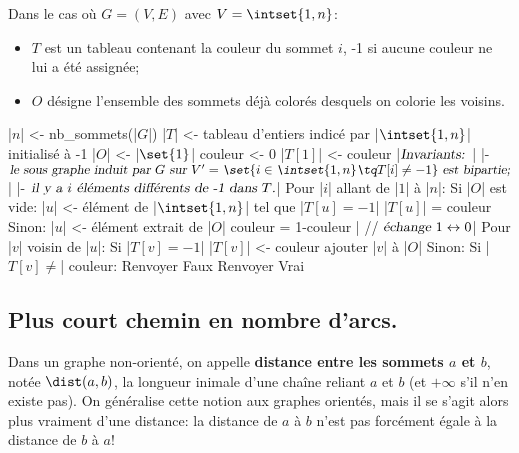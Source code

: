 \documentclass{scrartcl}
\begin{document}
			Dans le cas où $G=(V,E)$ avec $V = \intset{1,n}$:
			\begin{itemize}
				\item $T$ est un tableau contenant la couleur du sommet $i$, -1 si aucune couleur ne lui a été assignée;
				\item $O$ désigne l'ensemble des sommets déjà colorés desquels on colorie les voisins.
			\end{itemize}
			\begin{algotext}
				|$n$| <- nb_sommets(|$G$|)
				|$T$| <- tableau d'entiers indicé par |$\intset{1,n}$| initialisé à -1
				|$O$| <- |$\set{1}$|
				couleur <- 0
				|$T[1]$| <- couleur
				|$\textsl{Invariants: }$|
					|- $ \textsl{le sous graphe induit par $G$ sur $V' = \set{i \in \intset{1,n} \tq T[i] \neq -1}$ est bipartie;}$|
					|- $ \textsl{il y a $i$ éléments différents de -1 dans $T$.}$|
				Pour |$i$| allant de |$1$| à |$n$|:
					Si |$O$| est vide:
						|$u$| <- élément de |$\intset{1,n}$| tel que |$T[u] = -1$|
						|$T[u]$| = couleur
					Sinon:
						|$u$| <- élément extrait de |$O$|
					couleur = 1-couleur |				// $\textsl{échange }1 \leftrightarrow 0$|
					Pour |$v$| voisin de |$u$|:
						Si |$T[v] = -1$|
							|$T[v]$| <- couleur
							ajouter |$v$| à |$O$|
						Sinon:
							Si |$T[v] \neq$| couleur:
								Renvoyer Faux
				Renvoyer Vrai
			\end{algotext}

		\subsection{Plus court chemin en nombre d'arcs.}
			 Dans un graphe non-orienté, on appelle \textbf{distance entre les sommets $a$ et $b$}, notée $\dist(a,b)$,
			la longueur inimale d'une chaîne reliant $a$ et $b$ (et $+\infty$ s'il n'en existe pas).
			On généralise cette notion aux graphes orientés, mais il se s'agit alors plus vraiment d'une distance: 
			la distance de $a$ à $b$ n'est pas forcément égale à la distance de $b$ à $a$! 
\end{document}
